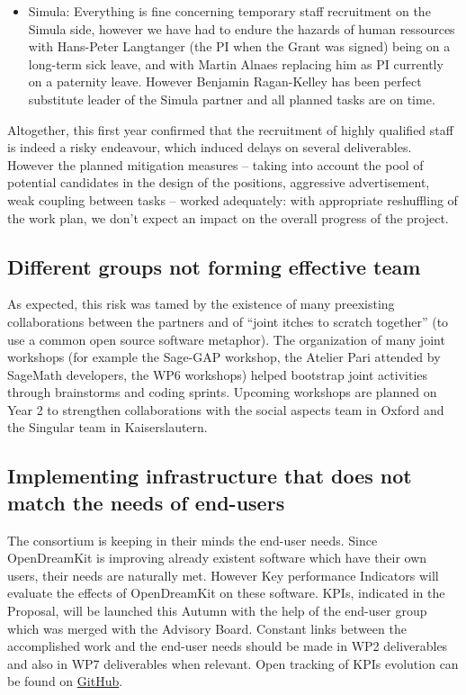 \documentclass{deliverablereport}
\begin{document}
\begin{itemize}
\item{Simula:} Everything is fine concerning temporary staff recruitment on the Simula side, however we have had to endure the hazards of human ressources with Hans-Peter Langtanger (the PI when the Grant was signed) being on a long-term sick leave, and with Martin Alnaes replacing him as PI currently on a paternity leave. However Benjamin Ragan-Kelley has been perfect  substitute leader of the Simula partner and all planned tasks are on time.\\
\end{itemize}


Altogether, this first year confirmed that the recruitment of highly
qualified staff is indeed a risky endeavour, which induced delays on
several deliverables. However the planned mitigation measures --
taking into account the pool of potential candidates in the design of
the positions, aggressive advertisement, weak coupling between tasks
-- worked adequately: with appropriate reshuffling of the work plan,
we don't expect an impact on the overall progress of the project.

\subsection{Different groups not forming effective team}

As expected, this risk was tamed by the existence of many preexisting
collaborations between the partners and of ``joint itches to scratch
together'' (to use a common open source software metaphor). The
organization of many joint workshops (for example the Sage-GAP
workshop, the Atelier Pari attended by SageMath developers, the WP6
workshops) helped bootstrap joint activities through brainstorms and
coding sprints. Upcoming workshops are planned on Year 2 to strengthen
collaborations with the social aspects team in Oxford and the Singular
team in Kaiserslautern.


\subsection{Implementing infrastructure that does not match the needs of end-users}

The consortium is keeping in their minds the end-user needs. Since
OpenDreamKit is improving already existent software which have their
own users, their needs are naturally met. However Key performance
Indicators will evaluate the effects of OpenDreamKit on these
software. KPIs, indicated in the Proposal, will be launched this
Autumn with the help of the end-user group which was merged with the
Advisory Board. Constant links between the accomplished work and the
end-user needs should be made in WP2 deliverables and also in WP7
deliverables when relevant.  Open tracking of KPIs evolution can be
found on
\href{https://github.com/OpenDreamKit/OpenDreamKit/labels/KPI}{GitHub}.
\end{document}
